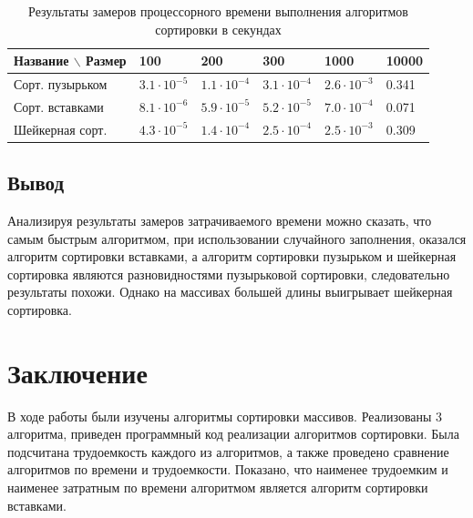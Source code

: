 \documentclass[12pt,a4paper]{report}
\begin{document}
\begin{table}[h]
\caption{Результаты замеров процессорного времени выполнения алгоритмов сортировки в секундах}
\label{tabular:timesandtenses}
\begin{center}
\begin{tabular}{ | l | l | l | l | l | l | }
\hline
    Название $\backslash$ Размер & 100                 & 200                 & 300                 & 1000                & 10000 \\ \hline
    Сорт. пузырьком              & $3.1 \cdot 10^{-5}$ & $1.1 \cdot 10^{-4}$ & $3.1 \cdot 10^{-4}$ & $2.6 \cdot 10^{-3}$ & 0.341 \\ \hline
    Сорт. вставками              & $8.1 \cdot 10^{-6}$ & $5.9 \cdot 10^{-5}$ & $5.2 \cdot 10^{-5}$ & $7.0 \cdot 10^{-4}$ & 0.071 \\ \hline
    Шейкерная сорт.              & $4.3 \cdot 10^{-5}$ & $1.4 \cdot 10^{-4}$ & $2.5 \cdot 10^{-4}$ & $2.5 \cdot 10^{-3}$ & 0.309 \\ \hline
\end{tabular}
\end{center}
\end{table}

\section{Вывод}

Анализируя результаты замеров затрачиваемого времени можно сказать, что самым быстрым алгоритмом, при использовании 
случайного заполнения, оказался алгоритм сортировки вставками, а алгоритм сортировки пузырьком и шейкерная сортировка 
являются разновидностями пузырьковой сортировки, следовательно результаты похожи. 
Однако на массивах большей длины выигрывает шейкерная сортировка.

\newpage
\chapter*{Заключение}

В ходе работы были изучены алгоритмы сортировки массивов. 
Реализованы 3 алгоритма, приведен программный код реализации алгоритмов сортировки.
Была подсчитана трудоемкость каждого из алгоритмов, а также проведено сравнение алгоритмов по времени
 и трудоемкости. Показано, что наименее трудоемким и наименее затратным по времени алгоритмом является 
алгоритм сортировки вставками.\\
\end{document}
